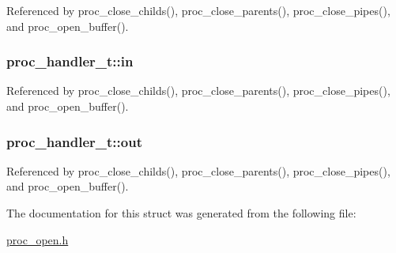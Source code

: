 Referenced by proc\-\_\-close\-\_\-childs(), proc\-\_\-close\-\_\-parents(), proc\-\_\-close\-\_\-pipes(), and proc\-\_\-open\-\_\-buffer().

\hypertarget{structproc__handler__t_af604107ad35c078cd3bd12dac8ba7344}{
\subsubsection[{in}]{ proc\-\_\-handler\-\_\-t\-::in}}\label{structproc__handler__t_af604107ad35c078cd3bd12dac8ba7344}


Referenced by proc\-\_\-close\-\_\-childs(), proc\-\_\-close\-\_\-parents(), proc\-\_\-close\-\_\-pipes(), and proc\-\_\-open\-\_\-buffer().

\hypertarget{structproc__handler__t_a7d16989b9886bfbfc0bfd1213c144361}{
\subsubsection[{out}]{ proc\-\_\-handler\-\_\-t\-::out}}\label{structproc__handler__t_a7d16989b9886bfbfc0bfd1213c144361}


Referenced by proc\-\_\-close\-\_\-childs(), proc\-\_\-close\-\_\-parents(), proc\-\_\-close\-\_\-pipes(), and proc\-\_\-open\-\_\-buffer().



The documentation for this struct was generated from the following file\-:\begin{DoxyCompactItemize}
\item 
\hyperlink{proc__open_8h}{proc\-\_\-open.\-h}\end{DoxyCompactItemize}
